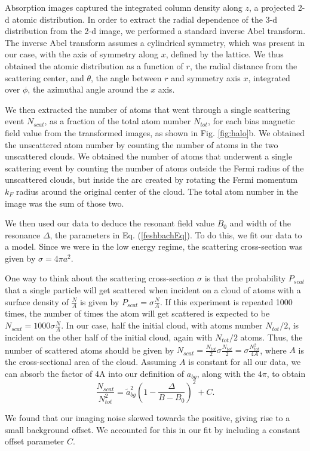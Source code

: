 \documentclass[12pt]{iopart}
\begin{document}
\par Absorption images captured the integrated column density along $z$, a projected 2-d atomic distribution. In order to extract the radial dependence of the 3-d distribution from the 2-d image, we performed a standard inverse Abel transform. The inverse Abel transform assumes a cylindrical symmetry, which was present in our case, with the axis of symmetry along $x$, defined by the lattice. We thus obtained the atomic distribution as a function of $r$, the radial distance from the scattering center, and $\theta$, the angle between $r$ and symmetry axis $x$, integrated over $\phi$, the azimuthal angle around the $x$ axis. 
\par We then extracted the number of atoms that went through a single scattering event $N_{scat}$, as a fraction of the total atom number $N_{tot}$, for each bias magnetic field value from the transformed images, as shown in Fig. \ref{fig:halo}b. We obtained the unscattered atom number by counting the number of atoms in the two unscattered clouds. We obtained the number of atoms that underwent a single scattering event by counting the number of atoms outside the Fermi radius of the unscattered clouds, but inside the arc created by rotating the Fermi momentum $k_F$ radius around the original center of the cloud. The total atom number in the image was the sum of those two.
\par We then used our data to deduce the resonant field value $B_0$ and width of the resonance  $\Delta$, the parameters in Eq. (\ref{feshbachEq}). To do this, we fit our data to a model. Since we were in the low energy regime, the scattering cross-section was given by $\sigma=4\pi a^2$. 
\par One way to think about the scattering cross-section $\sigma$ is that the probability $P_{scat}$ that a single particle will get scattered when incident on a cloud of atoms with a surface density of $\frac{N}{A}$ is given by $P_{scat}=\sigma \frac{N}{A}$. If this experiment is repeated 1000 times, the number of times the atom will get scattered is expected to be $N_{scat}=1000 \sigma \frac{N}{A}$.  In our case, half the initial cloud, with atoms number $N_{tot}/2$, is incident on the other half of the initial cloud, again with $N_{tot}/2$ atoms. Thus, the number of scattered atoms should be given by $N_{scat}=\frac{N_{tot}}{2} \sigma \frac{N_{tot}}{2}=\sigma \frac{N_{tot}^2}{4A}$, where $A$ is the cross-sectional area of the cloud. Assuming $A$ is constant for all our data, we can absorb the factor of 4A into our definition of $a_{bg}$, along with the $4\pi$, to obtain
\begin{equation}
\frac{N_{scat}}{N_{tot}^2}=\tilde{a}_{bg}^2\left(1-\frac{\Delta}{B-B_0}\right)^2 + C.
\label{eq:fit}
\end{equation}
\par We found that our imaging noise skewed towards the positive, giving rise to a small background offset. We accounted for this in our fit by including a constant offset parameter $C$. 
\end{document}
